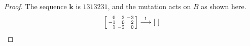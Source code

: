 \documentclass{amsart}
\theoremstyle{definition}
\theoremstyle{remark}
\numberwithin{equation}{section}
\newcommand{\0}{{\mathbf{0}}}
\newcommand{\kk}{{\boldsymbol{k}}}
\begin{document}
\begin{proof}
The sequence $\kk$ is $1313231$, and the mutation acts on $B$ as shown here.
\begin{multline*}
\begin{bsmallmatrix*}[r]
0&3&-3\\
-1&0&2\\
1&-2&0
\end{bsmallmatrix*}
\overset{1}{\longrightarrow}
\begin{bsmallmatrix*}[r]

\end{bsmallmatrix*}
\end{multline*}
\end{proof}
\end{document}

